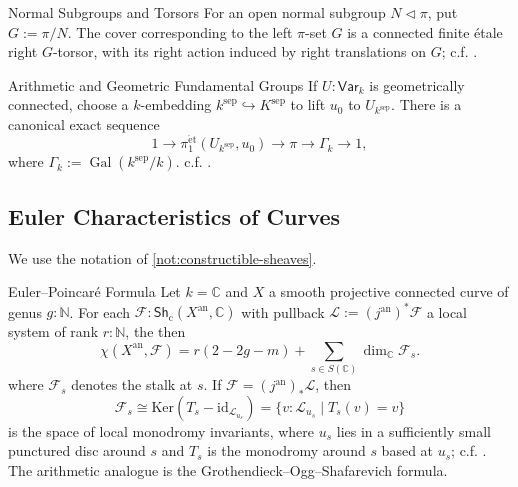 \documentclass[11pt,letterpaper]{article}
\theoremstyle{numberfirstplain}
\numberwithin{equation}{theorem}
\theoremstyle{numberfirstupright}
\begin{document}
\begin{custom}{Normal Subgroups and Torsors}\label{prop:etale-normal-subgroups-torsors}
For an open normal subgroup $N\triangleleft\pi$, put $G:=\pi/N$. The cover corresponding to the left $\pi$-set $G$ is a connected finite \'{e}tale right $G$-torsor, with its right action induced by right translations on $G$; c.f. \cite[\S58.7, Tag~03SF]{StacksProject}.
\end{custom}

\begin{custom}{Arithmetic and Geometric Fundamental Groups}\label{prop:arithmetic-geometric-fundamental-groups}
If $U:\mathsf{Var}_k$ is geometrically connected, choose a $k$-embedding $k^{\mathrm{sep}}\hookrightarrow K^{\mathrm{sep}}$ to lift $u_0$ to $U_{k^{\mathrm{sep}}}$. There is a canonical exact sequence
\[
1\longrightarrow\pi_1^{\mathrm{\acute{e}t}}(U_{k^{\mathrm{sep}}},u_0)
\longrightarrow\pi\longrightarrow\Gamma_k\longrightarrow1,
\]
where $\Gamma_k:=\operatorname{Gal}(k^{\mathrm{sep}}/k)$.
c.f. \cite[Lemma~58.14.3, Tag~0BTX]{StacksProject}.
\end{custom}

\subsection{Euler Characteristics of Curves}\label{app:euler-characteristics-of-curves}

We use the notation of \cref{not:constructible-sheaves}.

\begin{custom}{Euler–Poincaré Formula}\label{thm:euler-poincare}
Let $k=\mathbb C$ and $X$ a smooth projective connected curve of genus $g:\mathbb N$. 
For each $\mathcal F:\mathsf{Sh}_{\mathrm c}(X^{\mathrm{an}},\mathbb C)$ with pullback $\mathcal L:=(j^{\mathrm{an}})^*\mathcal F$ a local system of rank $r:\mathbb N$, the then
\[\chi(X^{\mathrm{an}},\mathcal F)=r(2-2g-m)
  +\sum_{s\in S(\mathbb C)}\dim_{\mathbb C}\mathcal F_s.\]
where $\mathcal F_s$ denotes the stalk at $s$. If $\mathcal F=(j^{\mathrm{an}})_*\mathcal L$, then
$$\mathcal F_s\cong\mathrm{Ker}(T_s-\mathrm{id}_{\mathcal L_{u_s}})=\{v:\mathcal L_{u_s}\mid T_s(v)=v\}$$
is the space of local monodromy invariants, where $u_s$ lies in a sufficiently small punctured disc around $s$ and $T_s$ is the monodromy around $s$ based at $u_s$; c.f. \cite[\S1.0.2 and proof of Theorem~1.1.2]{Katz1996}.
The arithmetic analogue is the Grothendieck–Ogg–Shafarevich formula. 
\end{custom}
\end{document}
